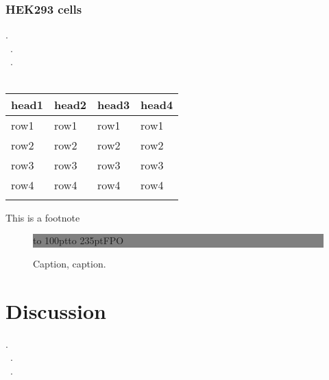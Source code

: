 \documentclass{bioinfo}
\begin{document}
\begin{methods}
\subsubsection{HEK293 cells}
.\\\
.\\\
.\\\


\begin{table}[!t]
 {\begin{tabular}{@{}llll@{}}\toprule head1 &
head2 & head3 & head4\\\midrule
row1 & row1 & row1 & row1\\
row2 & row2 & row2 & row2\\
row3 & row3 & row3 & row3\\
row4 & row4 & row4 & row4\\\botrule
\end{tabular}}{This is a footnote}
\end{table}

\end{methods}

\begin{figure}[!tpb]%
\fboxsep=0pt\colorbox{gray}{\begin{minipage}[t]{235pt} \vbox to 100pt{\vfill\hbox to
235pt{\hfill\fontsize{24pt}{24pt}\selectfont FPO\hfill}\vfill}
\end{minipage}}
\caption{Caption, caption.}\label{fig:01}
\end{figure}




\section{Discussion}
.\\\
.\\\
.\\\









%
%
\end{document}
